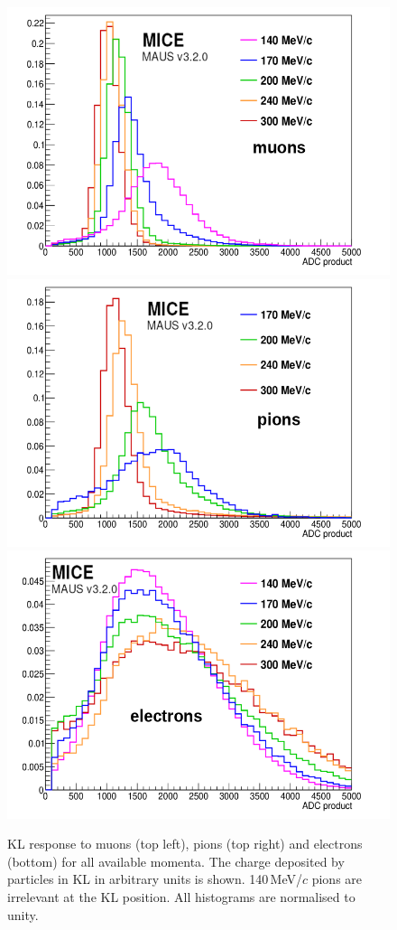 \begin{figure}
  \begin{center}
    \includegraphics[width=0.45\columnwidth]{./04-KL/Figures/muon-edited.png}
    \includegraphics[width=0.45\columnwidth]{./04-KL/Figures/pion-edited.png}
    \includegraphics[width=0.45\columnwidth]{./04-KL/Figures/electron-edited.png}
  \end{center}
  \caption{
    KL response to muons (top left), pions (top right) and electrons
    (bottom) for all available momenta.
    The charge deposited by particles in KL in arbitrary units is
    shown.
    140\,MeV/$c$ pions are irrelevant at the KL position.
    All histograms are normalised to unity.
  }
  \label{fig:KL3}
\end{figure}
  
